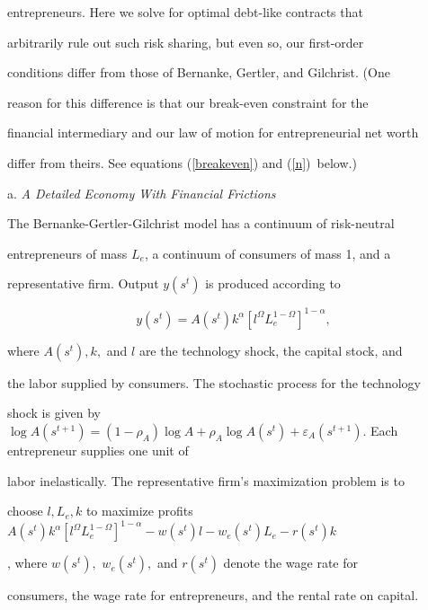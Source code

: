 \documentclass[fleqn,leqno,11pt]{article}
\begin{document}
entrepreneurs. Here we solve for optimal debt-like contracts that

arbitrarily rule out such risk sharing, but even so, our first-order

conditions differ from those of Bernanke, Gertler, and Gilchrist. (One

reason for this difference is that our break-even constraint for the

financial intermediary and our law of motion for entrepreneurial net worth

differ from theirs. See equations (\ref{breakeven}) and (\ref{n})\ below.)



\bigskip



\noindent a. \emph{A Detailed Economy With Financial Frictions}



The Bernanke-Gertler-Gilchrist model has a continuum of risk-neutral

entrepreneurs of mass $L_{e}$, a continuum of consumers of mass 1, and a

representative firm. Output $y(s^{t})$ is produced according to 

\begin{equation}

y(s^{t})=A(s^{t})k^{\alpha }\left[ l^{\Omega }L_{e}^{1-\Omega }\right]

^{1-\alpha },  \label{bggprodn}

\end{equation}%

where $A(s^{t}),k,$ and $l$ are the technology shock, the capital stock, and

the labor supplied by consumers. The stochastic process for the technology

shock is given by $\log A(s^{t+1})=(1-\rho _{A})\log A+\rho _{A}\log

A(s^{t})+\varepsilon _{A}(s^{t+1}).$ Each entrepreneur supplies one unit of

labor inelastically. The representative firm's maximization problem is to

choose $l,L_{e},k$ to maximize profits $A(s^{t})k^{\alpha }\left[ l^{\Omega

}L_{e}^{1-\Omega }\right] ^{1-\alpha }-w(s^{t})l-w_{e}(s^{t})L_{e}-r(s^{t})k$%

, where $w(s^{t}),$ $w_{e}(s^{t}),$ and $r(s^{t})$ denote the wage rate for

consumers, the wage rate for entrepreneurs, and the rental rate on capital.
\end{document}
